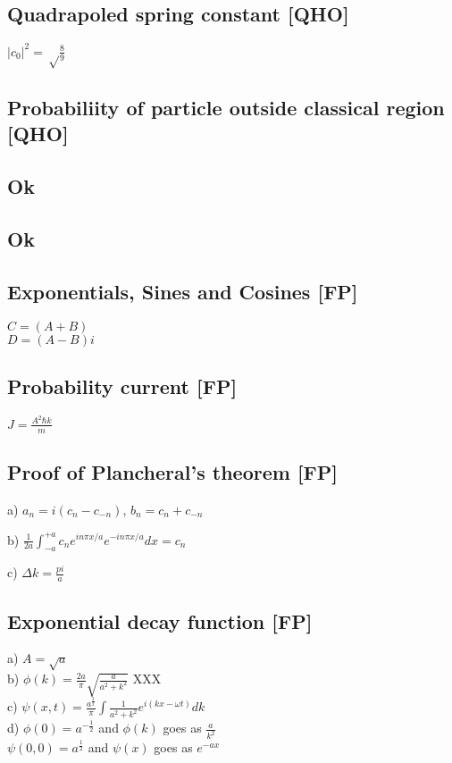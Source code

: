 \documentclass{article}
\newcommand{\half}{\frac{1}{2}}
\newcommand{\<}{\langle}
\renewcommand{\>}{\rangle}
\begin{document}
\subsection{Quadrapoled spring constant [QHO]}

$|c_0|^2 = \sqrt\frac{8}{9}$

\subsection{Probabiliity of particle outside classical region [QHO]}

\subsection{Ok}

\subsection{Ok}

\subsection{Exponentials, Sines and Cosines [FP]}

$C = (A+B)$
\\
$D = (A-B)i$

\subsection{Probability current [FP]}

$J = \frac{A^2\hbar k}{m}$

\subsection{Proof of Plancheral's theorem [FP]}

a) $a_n = i(c_n - c_{-n})$,
$b_n = c_n + c_{-n}$

b) $\frac{1}{2a}\int_{-a}^{+a} c_n e^{in\pi x/a}e^{-in\pi x/a} dx = c_n$

c) $\Delta k = \frac{pi}{a}$

\subsection{Exponential decay function [FP]}

a) $A = \sqrt a$ \\
b) $\phi(k) = \frac{2a}{\pi} \sqrt{\frac{a}{a^2 + k^2}}$ XXX \\
c) $\psi(x,t) = \frac{a^{\frac{3}{2}}}{\pi}\int\frac{1}{a^2+k^2} e^{i(kx-\omega t)} dk$ \\
d) $\phi(0) = a^{-\half}$ and $\phi(k)$ goes as $\frac{a}{k^2}$ \\
$\psi(0,0) = a^\half$ and $\psi(x)$ goes as $e^{-ax}$
\end{document}
